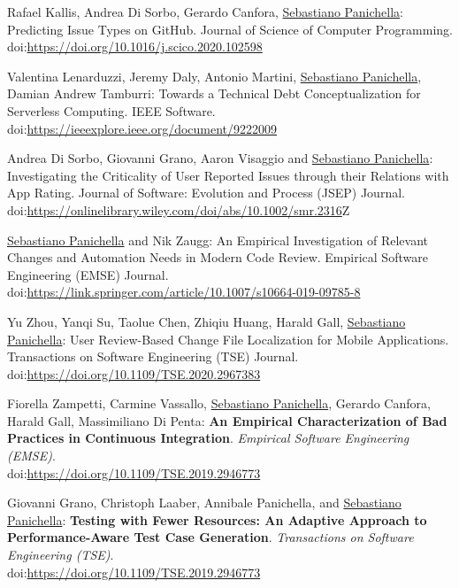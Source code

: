 \documentclass[10pt]{article}
\newcommand\doilink[1]{\href{http://dx.doi.org/#1}{#1}}
\newcommand\doi[1]{doi:\doilink{#1}}
\begin{document}
\begin{bibenum}
\item \label{J11}  Rafael Kallis, Andrea Di Sorbo, Gerardo Canfora, \underline{Sebastiano Panichella}: Predicting Issue Types on GitHub.  Journal of Science of Computer Programming.   \\ \doi{https://doi.org/10.1016/j.scico.2020.102598} 
\item \label{J10}   Valentina Lenarduzzi, Jeremy Daly, Antonio Martini, \underline{Sebastiano Panichella}, Damian Andrew Tamburri: Towards a Technical Debt Conceptualization for Serverless Computing.   IEEE Software.   \\ \doi{https://ieeexplore.ieee.org/document/9222009} 
\item \label{J09}  Andrea Di Sorbo, Giovanni Grano, Aaron Visaggio and \underline{Sebastiano Panichella}:  Investigating the Criticality of User Reported Issues through their Relations with App Rating.   Journal of Software: Evolution and Process (JSEP) Journal. \\ \doi{https://onlinelibrary.wiley.com/doi/abs/10.1002/smr.2316}Z
\item \label{J08}  \underline{Sebastiano Panichella} and Nik Zaugg:  An Empirical Investigation of Relevant Changes and Automation Needs in Modern Code Review.   Empirical Software Engineering (EMSE) Journal. \\ \doi{https://link.springer.com/article/10.1007/s10664-019-09785-8} 
\item \label{J07} Yu Zhou, Yanqi Su, Taolue Chen, Zhiqiu Huang, Harald Gall, \underline{Sebastiano Panichella}:  User Review-Based Change File Localization for Mobile Applications.  Transactions on Software Engineering (TSE) Journal. \\ \doi{https://doi.org/10.1109/TSE.2020.2967383} 
\item \label{J06} Fiorella Zampetti, Carmine Vassallo, \underline{Sebastiano Panichella}, Gerardo Canfora, Harald Gall, Massimiliano Di Penta:  \textbf{An Empirical Characterization of Bad Practices in Continuous Integration}.  \emph{Empirical Software Engineering (EMSE)}. \\ \doi{https://doi.org/10.1109/TSE.2019.2946773}
\item \label{J05} Giovanni Grano, Christoph Laaber, Annibale Panichella, and \underline{Sebastiano Panichella}:  \textbf{Testing with Fewer Resources: An Adaptive Approach to Performance-Aware Test Case Generation}.  \emph{Transactions on Software Engineering (TSE)}.  \\ \doi{https://doi.org/10.1109/TSE.2019.2946773}\\

\end{bibenum}
\end{document}
